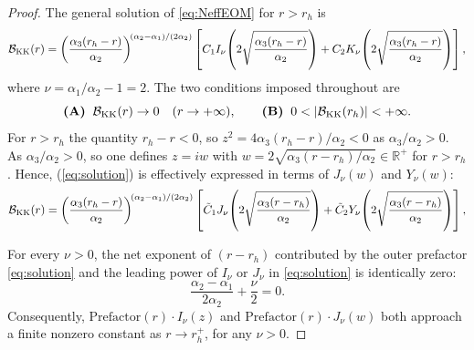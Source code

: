 \documentclass[a4paper,11pt,fleqn]{article}
\theoremstyle{plain}
\theoremstyle{definition}
\newcommand{\rh}{r_h}
\newcommand{\anu}{\alpha_1}
\newcommand{\ade}{\alpha_2}
\newcommand{\ath}{\alpha_3}
\begin{document}
\begin{proof}
The general solution of \eqref{eq:NeffEOM} for $r>\rh$ is
\begin{equation}
\mathcal{B}_{\rm KK}(r) = \left(\frac{\ath(\rh-r)}{\ade}\right)^{\!(\ade-\anu)/(2\ade)}
\left[
  C_1  I_{\nu}\!\left(2\sqrt{\frac{\ath(\rh-r)}{\ade}}\right)
  + C_2
  K_{\nu}\!\left(2\sqrt{\frac{\ath(\rh-r)}{\ade}}\right)
\right],
\label{eq:solution}
\end{equation}
where $\nu = \anu/\ade - 1 = 2$. 
The two conditions imposed throughout are
\begin{equation}
\textbf{(A)}\;\;{\cal B}_{\rm KK}(r)\to 0\quad(r\to+\infty),\qquad
\textbf{(B)}\;\;0<|{\cal B}_{\rm KK}(\rh)|<+\infty.
\label{eq:condAB}
\end{equation}
For $r > \rh$ the quantity $\rh - r < 0$, so $z^2 =
4\ath(\rh-r)/\ade < 0$ as $\ath/\ade > 0$. As $\ath/\ade > 0$, so one defines $z = iw$ with $w = 2\sqrt{\ath(r-\rh)/\ade} \in \mathbb{R}^+$ for $r > \rh$. Hence, (\ref{eq:solution}) is effectively expressed in terms of $J_\nu(w)$ and $Y_\nu(w)$:
\begin{equation}
\mathcal{B}_{\rm KK}(r) = \left(\frac{\ath(\rh-r)}{\ade}\right)^{\!(\ade-\anu)/(2\ade)}
\left[
  \tilde{C}_1  J_{\nu}\!\left(2\sqrt{\frac{\ath(r - \rh)}{\ade}}\right)
  + \tilde{C}_2
  Y_{\nu}\!\left(2\sqrt{\frac{\ath(r -\rh)}{\ade}}\right)
\right],
\label{eq:solution-JY}
\end{equation}

For every $\nu > 0$, the net exponent of $(r-\rh)$ contributed by the
outer prefactor \eqref{eq:solution} and the leading power of $I_\nu$
or $J_\nu$ in \eqref{eq:solution} is identically zero:
\begin{equation}
\frac{\ade-\anu}{2\ade} + \frac{\nu}{2} = 0.
\label{eq:identity}
\end{equation}
Consequently, $\mathrm{Prefactor}(r)\cdot I_\nu(z)$ and
$\mathrm{Prefactor}(r)\cdot J_\nu(w)$ both approach a finite nonzero
constant as $r \to \rh^+$, for any $\nu > 0$.


\end{proof}
\end{document}
